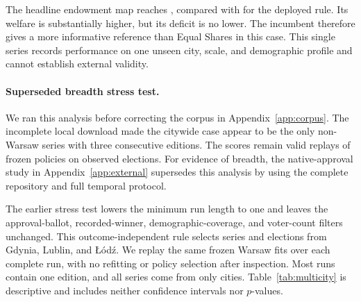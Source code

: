 The headline endowment map reaches \TransferEndowCSD{}, compared with
\TransferHistCSD{} for the deployed rule. Its welfare is substantially higher,
but its deficit is no lower. The incumbent therefore gives a more informative
reference than Equal Shares in this case. This single series records
performance on one unseen city, scale, and demographic profile and cannot
establish external validity.

\paragraph{Superseded breadth stress test.}
We ran this analysis before correcting the corpus in
Appendix~\ref{app:corpus}. The incomplete local download made the citywide case
appear to be the only non-Warsaw series with three consecutive editions. The
scores remain valid replays of frozen policies on observed elections. For
evidence of breadth, the native-approval study in Appendix~\ref{app:external}
supersedes this analysis by using the complete repository and full temporal
protocol.

The earlier stress test lowers the minimum run length to one and leaves the
approval-ballot, recorded-winner, demographic-coverage, and voter-count filters
unchanged. This outcome-independent rule selects \MultiAllSeriesN{} series and
\MultiAllElectionN{} elections from Gdynia, Lublin, and \L{}\'od\'z. We replay
the same frozen Warsaw fits over each complete run, with no refitting or policy
selection after inspection. Most runs contain one edition, and all series come
from only \MultiCityN{} cities. Table~\ref{tab:multicity} is descriptive and
includes neither confidence intervals nor $p$-values.

